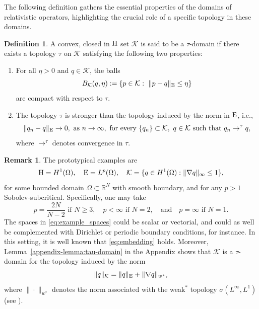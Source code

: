 \documentclass{article}
\newcommand{\boK}{\mathcal{K}}
\newcommand{\R}{\mathbb{R}}
\newcommand{\Hilb}{{\textnormal H}}
\newcommand{\Ebanach}{{\textnormal E}}
\newcommand{\ball}{B_\boK}
\theoremstyle{definition}
\newtheorem{remark}{Remark}[section]
\newtheorem{definition}{Definition}[section]
\begin{document}
The following definition gathers the essential properties of the domains of relativistic operators, highlighting the crucial role of a specific topology in these domains.
\begin{definition}\label{def:domain-K}
A convex, closed in $\Hilb$ set $\boK$ is said to be a $\tau$-domain if there exists a topology $\tau$ on $\boK$ satisfying the following two properties:
\begin{enumerate}
\item[(i)] For all $\eta>0$ and $q\in\boK$, the balls
\begin{equation}\label{def:ball}
\ball(q,\eta):=\{p\in\boK:\ \|p-q\|_{\textnormal E}\leq \eta\}
\end{equation}
are compact with respect to $\tau$.
\item[(ii)] The topology $\tau$ is stronger than the topology induced by the norm in ${\textnormal E}$, i.e.,   \begin{equation}\label{hyp:tau_stronger}
\|q_n-q\|_{\textnormal E}\to 0,\text{ as }n\to\infty,\text{ for every }\{q_n\}\subset\boK,\ q\in\boK\text{ such that }q_n\rightarrow^{\tau}q, 
\end{equation}
where $\rightarrow^{\tau}$ denotes convergence in $\tau$.
\end{enumerate}
\end{definition}
\begin{remark}\label{Remarks:Prototypical-Examples}
The prototypical examples are
\begin{equation}\label{eq:example_spaces}
\Hilb=H^1(\Omega),\quad {\textnormal E}=L^p(\Omega),\quad \boK=\{q\in H^1(\Omega): \|\nabla q\|_{\infty}\leq 1\},
\end{equation}
for some bounded domain  $\Omega\subset\R^N$ with smooth boundary, and for any $p>1$ Sobolev-subcritical. Specifically, one may take
\[p=\frac{2N}{N-2}\text{ if }N\geq 3,\quad p<\infty\text{ if }N=2,\quad\text{and}\quad p=\infty \text{ if }N=1.\]
The spaces in \eqref{eq:example_spaces} could be scalar or vectorial, and could as well be complemented with Dirichlet or periodic boundary conditions, for instance. In this setting, it is well known that \eqref{eq:embedding} holds. Moreover, Lemma~\ref{appendix-lemma:tau-domain} in the Appendix shows that $\boK$ is a $\tau$-domain for the topology induced by the norm
\begin{equation}\label{eq:topology-K}
\|q\|_\boK = \|q\|_{\Ebanach} + \|\nabla q\|_{w^*},
\end{equation}
where $\|\cdot\|_{w^*}$ denotes the norm associated with the weak$^*$ topology $\sigma(L^\infty, L^1)$ (see  \cite[Theorem 3.28]{Bre}).
\end{remark}
\end{document}
